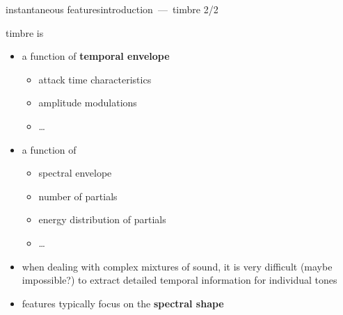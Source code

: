         \begin{frame}{instantaneous features}{introduction~---~timbre 2/2}
        
            timbre is
            \begin{itemize}
                \item   a function of \textbf{temporal envelope}
                    \begin{itemize}
                        \item   attack time characteristics
                        \item   amplitude modulations
                        \item   \ldots
                    \end{itemize}
                \item<2->   a function of 
                    \begin{itemize}
                        \item   spectral envelope
                        \item   number of partials
                        \item   energy distribution of partials
                        \item   \ldots
                    \end{itemize}
            \end{itemize}

            \begin{itemize}
                \item<3->[] when dealing with complex mixtures of sound, it is very difficult (maybe impossible?) to extract detailed temporal information for individual tones
                \item<4->[$\Rightarrow$] features typically focus on the \textbf{spectral shape}
            \end{itemize}
        \end{frame}

